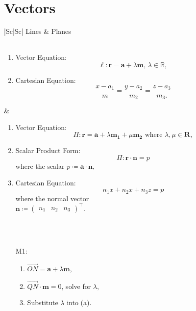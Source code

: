 \documentclass[oneside]{book}
\begin{document}
\chapter{Vectors}
\begin{longtable}{|Sc|Sc|}
  \hline
  Lines & Planes\\
  \hline
  \\
  \hline
  \begin{minipage}{0.5\textwidth}
    \begin{enumerate}
      \item Vector Equation: \[\ell \colon \mathbf{r}=\mathbf{a}+\lambda \mathbf{m}\text{, }\lambda \in \mathbb{R},\]
      \item Cartesian Equation: 
      \[\frac{x-a_1}{m}=\frac{y-a_2}{m_2}=\frac{z-a_3}{m_3.}\]
    \end{enumerate}
\end{minipage} & 
\begin{minipage}{0.5\textwidth}
\begin{enumerate}
  \item Vector Equation: 
  \[\Pi \colon \mathbf{r}=\mathbf{a}+\lambda
  \mathbf{m_1}+\mu \mathbf{m_2}\text{ where }\lambda,\mu\in\mathbf{R},\]
  \item Scalar Product Form: 
  \[\Pi \colon \mathbf{r} \cdot \mathbf{n}=p\]
  where the scalar \(p\coloneq  \mathbf{a}\cdot \mathbf{n}\),
  \item Cartesian Equation:
  \[n_1x+n_2x+n_3z=p\]
  where the normal vector\\
  \(\mathbf{n}\coloneq \begin{pmatrix}
    n_1 & n_2 & n_3
  \end{pmatrix}^\top\).
\end{enumerate}
\end{minipage}\\
\hline
{}\\
\hline
\begin{minipage}{0.5\textwidth}
  \begin{enumerate}
    \item[M1:] 
    \begin{enumerate}
      \item \(\overrightarrow{ON}=\mathbf{a}+\lambda \mathbf{m}\),
      \item \(\overrightarrow{QN} \cdot \mathbf{m}=0\), solve for \(\lambda\),
      \item Substitute \(\lambda\) into (a).
    \end{enumerate}

\end{enumerate}
\end{minipage}
\end{longtable}
\end{document}
